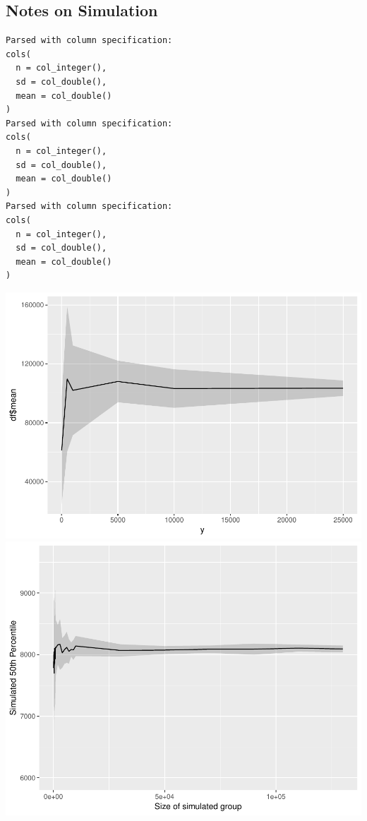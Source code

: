 \documentclass[12pt,twoside]{dukestatscithesis}
\theoremstyle{definition}
\theoremstyle{definition}
\theoremstyle{definition}
\theoremstyle{remark}
\begin{document}
\subsection{Notes on Simulation}\label{notes-on-simulation}
\begin{verbatim}
Parsed with column specification:
cols(
  n = col_integer(),
  sd = col_double(),
  mean = col_double()
)
Parsed with column specification:
cols(
  n = col_integer(),
  sd = col_double(),
  mean = col_double()
)
Parsed with column specification:
cols(
  n = col_integer(),
  sd = col_double(),
  mean = col_double()
)
\end{verbatim}
\includegraphics{thesis_files/figure-latex/unnamed-chunk-5-1.pdf}
\includegraphics{thesis_files/figure-latex/unnamed-chunk-5-2.pdf}
\end{document}
